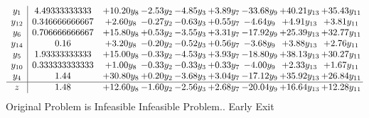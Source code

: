 \documentclass[9pt]{article}
\begin{document}
\[\begin{array}{c| c c@{\hskip 2pt} c@{\hskip 2pt} c@{\hskip 2pt} c@{\hskip 2pt} c@{\hskip 2pt} c@{\hskip 2pt} c@{\hskip 2pt} }
 y_{1}   &  4.49333333333 & + 10.20 y_{8} & -2.53 y_{2} & -4.85 y_{3} & +  3.89 y_{7} & -33.68 y_{9} & + 40.21 y_{13} & + 35.43 y_{11}\\
 y_{12}   &  0.346666666667 & +  2.60 y_{8} & -0.27 y_{2} & -0.63 y_{3} & +  0.55 y_{7} & -4.64 y_{9} & +  4.91 y_{13} & +  3.81 y_{11}\\
 y_{6}   &  0.706666666667 & + 15.80 y_{8} & +  0.53 y_{2} & -3.55 y_{3} & +  3.31 y_{7} & -17.92 y_{9} & + 25.39 y_{13} & + 32.77 y_{11}\\
 y_{14}   &  0.16 & +  3.20 y_{8} & -0.20 y_{2} & -0.52 y_{3} & +  0.56 y_{7} & -3.68 y_{9} & +  3.88 y_{13} & +  2.76 y_{11}\\
 y_{5}   &  1.93333333333 & + 15.00 y_{8} & -0.33 y_{2} & -4.53 y_{3} & +  3.93 y_{7} & -18.80 y_{9} & + 38.13 y_{13} & + 30.27 y_{11}\\
 y_{10}   &  0.333333333333 & +  1.00 y_{8} & -0.33 y_{2} & -0.33 y_{3} & +  0.33 y_{7} & -4.00 y_{9} & +  2.33 y_{13} & +  1.67 y_{11}\\
 y_{4}   &  1.44 & + 30.80 y_{8} & +  0.20 y_{2} & -3.68 y_{3} & +  3.04 y_{7} & -17.12 y_{9} & + 35.92 y_{13} & + 26.84 y_{11}\\
\hline
z    &  1.48 & + 12.60 y_{8} & -1.60 y_{2} & -2.56 y_{3} & +  2.68 y_{7} & -20.04 y_{9} & + 16.64 y_{13} & + 12.28 y_{11}\\
\end{array}\]
Original Problem is Infeasible
Infeasible Problem.. Early Exit
\end{document}
